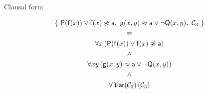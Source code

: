 
\begin{block}{Clausal form}
	\begin{center}
		\begin{gather*}
\left\{\
{\mathsf P}({\mathsf f}(x))\lor{\mathsf f}(x)\not\approx{\mathsf a},\
{\mathsf g}(x,y)\approx{\mathsf a}\lor\lnot{\mathsf Q}(x,y),\
{\mathcal C}_3 
\ \right\}
\\\equiv\\
\forall x\,(
{\mathsf P}({\mathsf f}(x))\lor{\mathsf f}(x)\not\approx{\mathsf a})
\\\land\\
\forall xy\,(
{\mathsf g}(x,y)\approx{\mathsf a}\lor\lnot{\mathsf Q}(x,y) )
\\\land\\
\forall\,{}{\mathcal V}\mathsf{ar}({\mathcal C}_3)\,(
{\mathcal C}_3 )\\
\end{gather*}\end{center}\end{block}